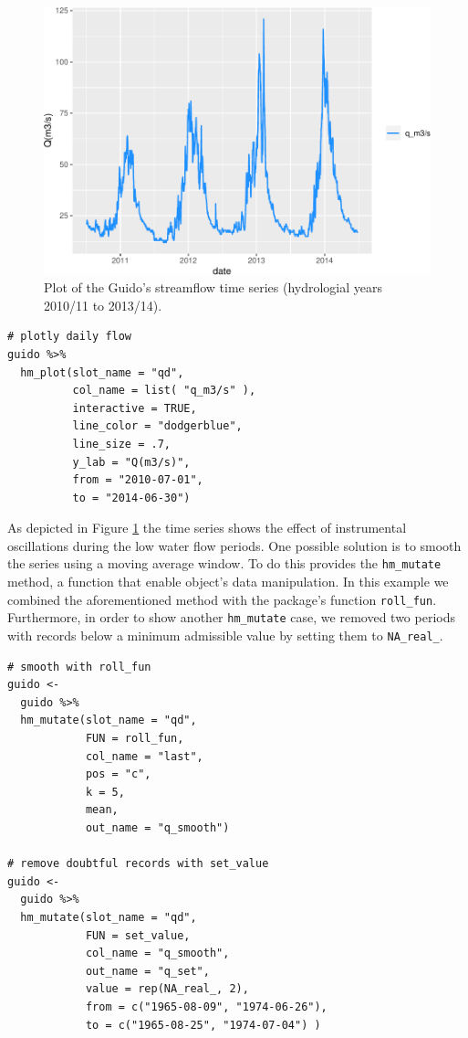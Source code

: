 \begin{figure}

{\centering \includegraphics[width=1\linewidth]{toum_files/figure-latex/guido-plot-static-1} 

}

\caption{Plot of the Guido's streamflow time series (hydrologial years 2010/11 to 2013/14).}\label{fig:guido-plot-static}
\end{figure}

\begin{verbatim}
# plotly daily flow
guido %>% 
  hm_plot(slot_name = "qd",
          col_name = list( "q_m3/s" ), 
          interactive = TRUE, 
          line_color = "dodgerblue",
          line_size = .7,
          y_lab = "Q(m3/s)", 
          from = "2010-07-01",
          to = "2014-06-30") 
\end{verbatim}

As depicted in Figure \ref{fig:guido-plot-static} the time
series shows the effect of instrumental oscillations during the low water
flow periods.
One possible solution is to smooth the series using a moving average window.
To do this  provides the \texttt{hm\_mutate}
method, a function that enable object's data manipulation. In this
example we combined the aforementioned method with the package's
function \texttt{roll\_fun}. Furthermore, in order to show another \texttt{hm\_mutate}
case, we removed two periods with records below a minimum
admissible value by setting them to \texttt{NA\_real\_}.

\begin{verbatim}
# smooth with roll_fun
guido <- 
  guido %>%
  hm_mutate(slot_name = "qd",
            FUN = roll_fun,
            col_name = "last",
            pos = "c",
            k = 5,
            mean,
            out_name = "q_smooth") 

# remove doubtful records with set_value
guido <- 
  guido %>%
  hm_mutate(slot_name = "qd",
            FUN = set_value,
            col_name = "q_smooth",
            out_name = "q_set",
            value = rep(NA_real_, 2),
            from = c("1965-08-09", "1974-06-26"),
            to = c("1965-08-25", "1974-07-04") )
\end{verbatim}

